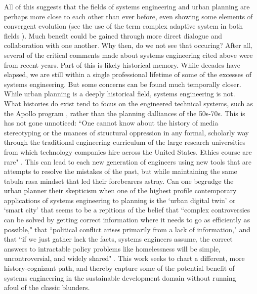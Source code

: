 \documentclass[notitlepage]{article}
\begin{document}
All of this suggests that the fields of systems engineering and urban planning are perhaps more close to each other than ever before, even showing some elements of convergent evolution (see the use of the term complex adaptive system in both fields \cite{yamuAssumingItAll2016}). Much benefit could be gained through more direct dialogue and collaboration with one another. Why then, do we not see that occuring? After all, several of the critical comments made about systems engineering cited above were from recent years. Part of this is likely historical memory. While decades have elapsed, we are still within a single professional lifetime of some of the excesses of systems engineering. But some concerns can be found much temporally closer. While urban planning is a deeply historical field, systems engineering is not. What histories do exist tend to focus on the engineered technical systems, such as the Apollo program \cite{brillSystemsEngineeringRetrospective1998}, rather than the planning dalliances of the 50s-70s. This is has not gone unnoticed: ``One cannot know about the history of media stereotyping or the nuances of structural oppression in any formal, scholarly way through the traditional engineering curriculum of the large research universities from which technology companies hire across the United States. Ethics course are rare" \cite{nobleAlgorithmsOppressionHow2018}. This can lead to each new generation of engineers using new tools that are attempts to resolve the mistakes of the past, but while maintaining the same tabula rasa mindset that led their forebearers astray. Can one begrudge the urban planner their skepticism when one of the highest profile contemporary applications of systems engineering to planning is the `urban digital twin' or `smart city' \cite{goldsmithResponsiveCityEngaging2014,sregantanSingaporePipsLondon2018, franciscoSmartCityDigital2020,ruohomakiSmartCityPlatform2018, gohBuildingSingaporeDigital2015} that seems to be a repitions of the belief that ``complex controversies can be solved by getting correct information where it needs to go as efficiently as possible," that ``political conflict arises primarily from a lack of information," and that ``if we just gather lack the facts, systems engineers assume, the correct answers to intractable policy problems like homelessness will be simple, uncontroversial, and widely shared" \cite{eubanksAutomatingInequalityHow2018}. This work seeks to chart a different, more history-cognizant path, and thereby capture some of the potential benefit of systems engineering in the sustainable development domain without running afoul of the classic blunders.
\end{document}

